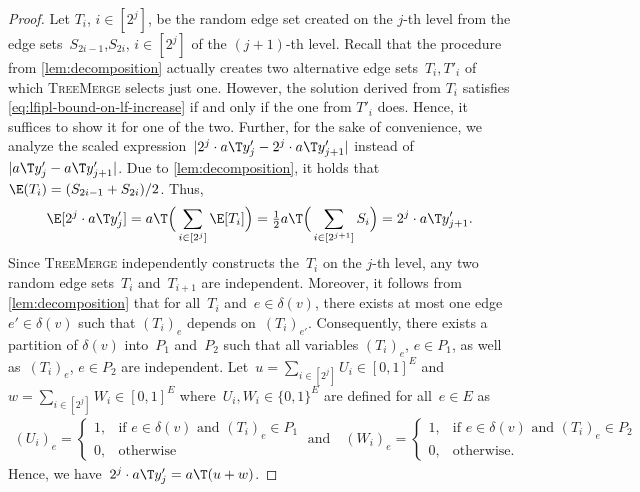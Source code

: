 \documentclass[a4paper,USenglish,cleveref,thm-restate]{lipics-v2021}
\begin{document}
\begin{proof}
    Let $T_i$, $i \in [2^{j}]$, be the random edge set created on the $j$-th level from the edge sets~$S_{2i-1}$,$S_{2i}$, $i\in [2^{j}]$ of the $(j+1)$-th level.
    Recall that the procedure from \cref{lem:decomposition} actually creates
    two alternative edge sets~$T_i,T'_i$ of which \textsc{TreeMerge} selects just one.
    However, the solution derived from $T_i$ satisfies \cref{eq:lfipl-bound-on-lf-increase} if and only if the one from $T'_i$ does. Hence, it suffices to show
    it for one of the two.
    Further, for the sake of convenience, we analyze the scaled expression~$|2^j \cdot a\T y'_j - 2^j \cdot a\T y'_{j+1}|$ instead of~$|a\T y'_j - a\T y'_{j+1}|$.
    Due to \cref{lem:decomposition}, it holds that $\E(T_i) = (S_{2i-1} + S_{2i})/2$.
    Thus,
    \begin{align*}
        \label{eq:ilf-expected-value}
        \E[2^j \cdot a\T y_{j}'] 
        = a\T \Big(\sum_{i \in [2^j]} \E[T_i] \Big)
        = \tfrac{1}{2} a\T \Big(\sum_{i \in [2^{j+1}]} S_{i} \Big)
        = 2^j \cdot a\T y_{j+1}'.
    \end{align*}
    Since \textsc{TreeMerge} independently constructs the~$T_i$ on the $j$-th level, any two random edge sets~$T_i$ and~$T_{i+1}$ are independent.
    Moreover, it follows from \cref{lem:decomposition} that for all~$T_i$ and~$e \in \delta(v)$, there exists at most one edge~$e' \in \delta(v)$ such that $(T_i)_e$ depends on~$(T_i)_{e'}$.
    Consequently, there exists a partition of $\delta(v)$ into~$P_1$ and~$P_2$ such that all variables $(T_i)_e$, $e\in P_1$, as well as~$(T_i)_e$, $e\in P_2$ are independent.
    Let~$u = \sum_{i \in [2^{j}]} U_{i} \in [0,1]^E$ and~$w = \sum_{i \in [2^{j}]} W_{i} \in [0,1]^E$ where~$U_i, W_i \in \{0,1\}^E$ are defined for all~$e \in E$ as
    \begin{align*}
        (U_i)_e =
        \begin{cases}
            1, & \text{if } e\in\delta(v) \text{ and } (T_i)_e \in P_1 \\
            0, & \text{otherwise}
        \end{cases}
        \; \text{and} \quad
        (W_i)_e =
        \begin{cases}
            1, & \text{if } e\in\delta(v) \text{ and } (T_i)_e \in P_2 \\
            0, & \text{otherwise}.
        \end{cases}
    \end{align*}
    Hence, we have~$2^j \cdot a\T y_{j}' = a\T(u + w)$.

\end{proof}
\end{document}
